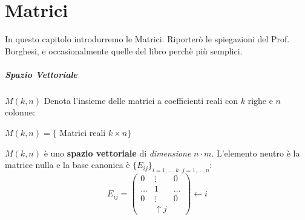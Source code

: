 \chapter{Matrici}
In questo capitolo introdurremo le Matrici.
Riporterò le spiegazioni del Prof. Borghesi, e occasionalmente quelle del libro perchè più semplici.

\paragraph{Spazio Vettoriale}
$M(k,n)$ Denota l'insieme delle matrici a coefficienti reali con $k$ righe e $n$ colonne:
\begin{center}
	$M(k,n)=\{$ Matrici reali $k\times n\}$
\end{center}
$M(k,n)$ è uno \textbf{spazio vettoriale} di \emph{dimensione} $n\cdot m$.
L'elemento neutro è la matrice nulla e la base canonica è $\{E_{ij}\}_{i=1,...,k \;\; j=1,...,n}$:
\[
	E_{ij} =   \begin{pmatrix}
		0     & \vdots     & 0     \\
		\dots & 1          & \dots \\
		0     & \vdots     & 0     \\
		      & \uparrow j
	\end{pmatrix}
	\leftarrow i
\]


